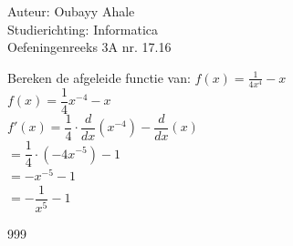 \documentclass[a4paper]{article}
\begin{document}
  
\noindent \large Auteur: Oubayy Ahale          \\
\noindent \large Studierichting: Informatica   \\
\noindent \large Oefeningenreeks 3A nr. 17.16  \\

\medskip

\normalsize

Bereken de afgeleide functie van: $ f(x) = \frac{1}{4x^4} - x $\\

$ f(x) = \dfrac{1}{4} x^{-4} - x $\\

$ f'(x) = \dfrac{1}{4} \cdot \dfrac{d}{dx} (x^{-4}) - \dfrac{d}{dx} (x) $\\

$ = \dfrac{1}{4} \cdot (-4x^{-5}) - 1 $\\

$ = -x^{-5} - 1 $\\

$ = -\dfrac{1}{x^5} - 1 $\\

\begin{thebibliography}{999}
\end{thebibliography}
\end{document}
